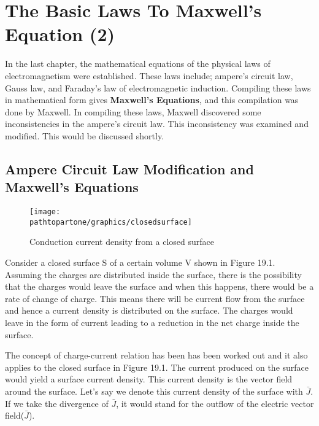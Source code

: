 \chapter{The Basic Laws To Maxwell's Equation (2)}\label{lec:lec19}
In the last chapter, the mathematical equations of the physical laws of electromagnetism were established. These laws include; ampere's circuit law, Gauss law, and Faraday's law of electromagnetic induction. Compiling these laws in mathematical form gives \textbf{Maxwell's Equations}, and this compilation was done by Maxwell. In compiling these laws, Maxwell discovered some inconsistencies in the ampere's circuit law. This inconsistency was examined and modified. This would be discussed shortly.

\section{Ampere Circuit Law Modification and Maxwell's Equations}
\begin{figure}[h]
\centering
\texttt{[image: \\pathtopartone/graphics/closedsurface]}
\caption{Conduction current density from a closed surface}
\end{figure}

Consider a closed surface S of a certain volume V shown in Figure 19.1. Assuming the charges are distributed inside the surface, there is the possibility that the charges would leave the surface and when this happens, there would be a rate of change of charge. This means there will be current flow from the surface and hence a current density is distributed on the surface. The charges would leave in the form of current leading to a reduction in the net charge inside the surface.

The concept of charge-current relation has been has been worked out and it also applies to the closed surface in Figure 19.1. The current produced on the surface would yield a surface current density. This current density is the vector field around the surface. Let's say we denote this current density of the surface with $\bar{J}$. If we take the divergence of $\bar{J}$, it would stand for the outflow of the electric vector field($\bar{J}$).

